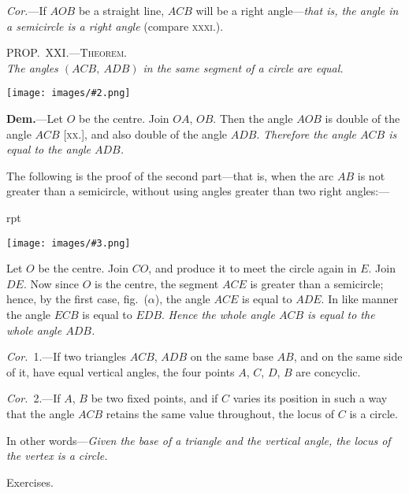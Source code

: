 \documentclass[oneside]{book}
\newcounter{wrapwidth}
\newcommand\myprop[2]{
\bigskip\Needspace*{4\baselineskip}\begin{center}\textsc{#1}\\\medskip\emph{#2}\par\end{center}
}
\newcommand\exhead[1]{
\Needspace*{5\baselineskip}\begin{center}
\textsf{#1}
\end{center}
}
\newcommand\imgflow[3]{
\setcounter{wrapwidth}{#1}
\begin{wrapfigure}[#2]{r}{\value{wrapwidth}pt}
\begin{center}
\vspace{-0.3in}
\texttt{[image: images/\#3.png]}
\end{center}
\end{wrapfigure}
}
\newcommand\imgcent[2]{
\begin{center}
\texttt{[image: images/\#2.png]}
\end{center}
}
\begin{document}
\emph{Cor.}---If $AOB$ be a straight line, $ACB$ will be a
right angle---\emph{that is, the angle in a semicircle is a right
angle} (compare \textsc{xxxi.}).

\myprop{PROP\@.~XXI\@.---Theorem.}{The angles $(ACB,\ ADB)$ in the same segment of a circle
are equal.}

\imgcent{235}{f127}

\textbf{Dem.}---Let $O$ be the centre. Join $OA$, $OB$. Then
the angle $AOB$ is double of the angle $ACB$ [\textsc{xx.}], and
also double of the angle $ADB$. \textit{Therefore the angle
$ACB$ is equal to the angle $ADB$.}

The following is the proof of the second part---that
is, when the arc $AB$ is not greater than a semicircle,
without using angles greater than two right angles:---

\imgflow{115}{9}{f128}

Let $O$ be the centre. Join $CO$, and produce it to meet
the circle again in $E$. Join $DE$.
Now since $O$ is the centre, the
segment $ACE$ is greater than a
semicircle; hence, by the first
case, fig.~($\alpha$), the angle $ACE$ is
equal to $ADE$. In like manner
the angle $ECB$ is equal to $EDB$.
\textit{Hence the whole angle $ACB$ is
equal to the whole angle $ADB$.}

\emph{Cor.}~1.---If two triangles $ACB$, $ADB$ on the same
base $AB$, and on the same side of it, have equal vertical
angles, the four points $A$, $C$, $D$, $B$ are concyclic\label{concylic1}.

\emph{Cor.}~2.---If $A$, $B$ be two fixed points, and if $C$ varies
its position in such a way that the angle $ACB$ retains
the same value throughout, the locus of $C$ is a circle.

In other words---\emph{Given the base of a triangle and the
vertical angle, the locus of the vertex is a circle.}

\exhead{Exercises.}
\end{document}
